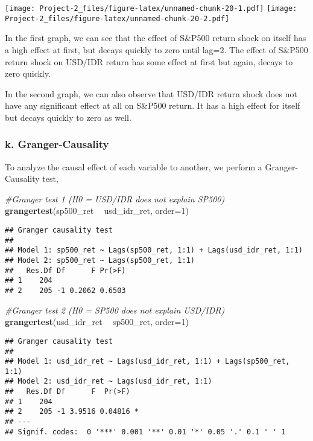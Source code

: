 \documentclass[]{article}
\newenvironment{Shaded}{\begin{snugshade}}{\end{snugshade}}
\newcommand{\KeywordTok}[1]{\textcolor[rgb]{0.13,0.29,0.53}{\textbf{#1}}}
\newcommand{\DataTypeTok}[1]{\textcolor[rgb]{0.13,0.29,0.53}{#1}}
\newcommand{\DecValTok}[1]{\textcolor[rgb]{0.00,0.00,0.81}{#1}}
\newcommand{\StringTok}[1]{\textcolor[rgb]{0.31,0.60,0.02}{#1}}
\newcommand{\CommentTok}[1]{\textcolor[rgb]{0.56,0.35,0.01}{\textit{#1}}}
\newcommand{\OperatorTok}[1]{\textcolor[rgb]{0.81,0.36,0.00}{\textbf{#1}}}
\newcommand{\NormalTok}[1]{#1}
\begin{document}
\texttt{[image: Project-2\_files/figure-latex/unnamed-chunk-20-1.pdf]}
\texttt{[image: Project-2\_files/figure-latex/unnamed-chunk-20-2.pdf]}

In the first graph, we can see that the effect of S\&P500 return shock
on itself has a high effect at first, but decays quickly to zero until
lag=2. The effect of S\&P500 return shock on USD/IDR return has some
effect at first but again, decays to zero quickly.

In the second graph, we can also observe that USD/IDR return shock does
not have any significant effect at all on S\&P500 return. It has a high
effect for itself but decays quickly to zero as well.

\subsubsection{k. Granger-Causality}\label{k.-granger-causality}

To analyze the causal effect of each variable to another, we perform a
Granger-Causality test,

\begin{Shaded}
\begin{Highlighting}[]
\CommentTok{#Granger test 1 (H0 = USD/IDR does not explain SP500)}
\KeywordTok{grangertest}\NormalTok{(sp500_ret }\OperatorTok{~}\StringTok{ }\NormalTok{usd_idr_ret, }\DataTypeTok{order=}\DecValTok{1}\NormalTok{)}
\end{Highlighting}
\end{Shaded}

\begin{verbatim}
## Granger causality test
## 
## Model 1: sp500_ret ~ Lags(sp500_ret, 1:1) + Lags(usd_idr_ret, 1:1)
## Model 2: sp500_ret ~ Lags(sp500_ret, 1:1)
##   Res.Df Df      F Pr(>F)
## 1    204                 
## 2    205 -1 0.2062 0.6503
\end{verbatim}

\begin{Shaded}
\begin{Highlighting}[]
\CommentTok{#Granger test 2 (H0 = SP500 does not explain USD/IDR)}
\KeywordTok{grangertest}\NormalTok{(usd_idr_ret }\OperatorTok{~}\StringTok{ }\NormalTok{sp500_ret, }\DataTypeTok{order=}\DecValTok{1}\NormalTok{)}
\end{Highlighting}
\end{Shaded}

\begin{verbatim}
## Granger causality test
## 
## Model 1: usd_idr_ret ~ Lags(usd_idr_ret, 1:1) + Lags(sp500_ret, 1:1)
## Model 2: usd_idr_ret ~ Lags(usd_idr_ret, 1:1)
##   Res.Df Df      F  Pr(>F)  
## 1    204                    
## 2    205 -1 3.9516 0.04816 *
## ---
## Signif. codes:  0 '***' 0.001 '**' 0.01 '*' 0.05 '.' 0.1 ' ' 1
\end{verbatim}
\end{document}
